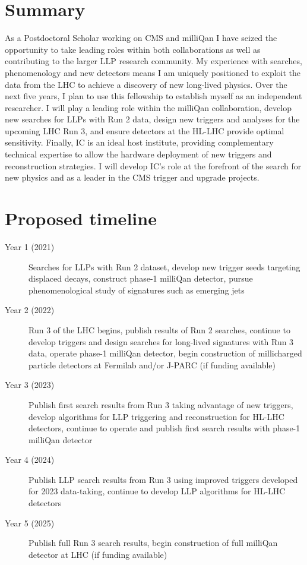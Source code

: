 \documentclass[11pt,a4paper]{article}
\theoremstyle{plain} \numberwithin{equation}{section}
\theoremstyle{definition}
\begin{document}
\section*{Summary}

As a Postdoctoral Scholar working on CMS and milliQan
I have seized the opportunity to take leading roles within both collaborations
as well as contributing to the larger LLP research community.
My experience with searches, phenomenology and 
new detectors means I am uniquely positioned to exploit the data
from the LHC to achieve a discovery of new long-lived physics.
Over the next five years, I plan to use this fellowship to establish
myself as an independent researcher. I will play a leading role 
within the milliQan collaboration, develop new searches for LLPs with Run 2 data, 
design new triggers and analyses for the upcoming LHC Run 3, and ensure detectors at the HL-LHC
provide optimal sensitivity. Finally, IC is an ideal host institute, providing
complementary technical expertise to allow the hardware deployment of new triggers and
reconstruction strategies. I will develop IC's role at the forefront
of the search for new physics and as a leader in the CMS trigger and
upgrade projects.


\section*{Proposed timeline}
\begin{description}
\item[Year 1 (2021)]{Searches for LLPs with Run 2 dataset, develop new trigger seeds
targeting displaced decays, construct phase-1 milliQan detector, pursue phenomenological study of signatures such as emerging jets}
\item[Year 2 (2022)]{Run 3 of the LHC begins, publish results of Run 2 searches, continue to develop triggers and design searches for long-lived signatures with Run 3 data, operate phase-1 milliQan detector, begin construction of millicharged particle detectors at Fermilab and/or J-PARC (if funding available)}
\item[Year 3 (2023)]{Publish first search results from Run 3 taking advantage of new triggers, develop algorithms for LLP triggering and reconstruction for HL-LHC detectors, continue to operate and publish first search results with phase-1 milliQan detector}
\item[Year 4 (2024)]{Publish LLP search results from Run 3 using improved triggers developed for 2023 data-taking, continue to develop LLP algorithms for HL-LHC detectors}
\item[Year 5 (2025)]{Publish full Run 3 search results, begin construction of full milliQan detector at LHC (if funding available)}
\end{description}


\end{document}
